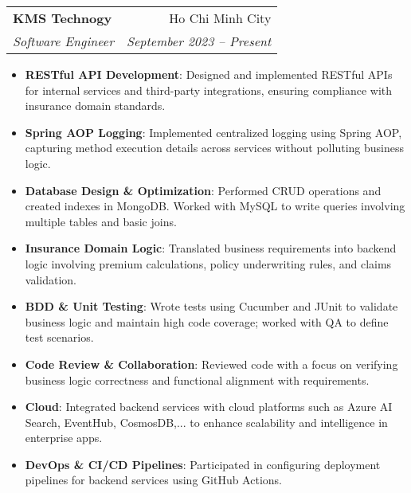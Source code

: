 \documentclass[letterpaper,11pt]{article}
\makeatletter
\newcommand{\resumeItem}[2]{
  \item\small{
    \textbf{#1}{: #2 \vspace{-2pt}}
  }
}
\newcommand{\resumeSubheading}[4]{
  \vspace{-1pt}\item
    \begin{tabular*}{0.97\textwidth}[t]{l@{\extracolsep{\fill}}r}
      \textbf{#1} & #2 \\
      \textit{\small#3} & \textit{\small #4} \\
    \end{tabular*}\vspace{-5pt}
}
\newcommand{\resumeSubSubheading}[2]{
    \begin{tabular*}{0.97\textwidth}{l@{\extracolsep{\fill}}r}
      \textit{\small#1} & \textit{\small #2} \\
    \end{tabular*}\vspace{-5pt}
}
\newcommand{\resumeItemListStart}{\begin{itemize}}
\newcommand{\resumeItemListEnd}{\end{itemize}\vspace{-5pt}}
\makeatother
\begin{document}
    \resumeSubheading
      {KMS Technogy}{Ho Chi Minh City}
      {Software Engineer}{September 2023 -- Present}
      \resumeItemListStart
        \resumeItem{RESTful API Development}
          {Designed and implemented RESTful APIs for internal services and third-party integrations, ensuring compliance with insurance domain standards.}
        \resumeItem{Spring AOP Logging}
          {Implemented centralized logging using Spring AOP, capturing method execution details across services without polluting business logic.}
        \resumeItem{Database Design \& Optimization}
          {Performed CRUD operations and created indexes in MongoDB. Worked with MySQL to write queries involving multiple tables and basic joins.}
        \resumeItem{Insurance Domain Logic}
          {Translated business requirements into backend logic involving premium calculations, policy underwriting rules, and claims validation.}
        \resumeItem{BDD \& Unit Testing}
          {Wrote tests using Cucumber and JUnit to validate business logic and maintain high code coverage; worked with QA to define test scenarios.}
        \resumeItem{Code Review \& Collaboration}
          {Reviewed code with a focus on verifying business logic correctness and functional alignment with requirements.}        
        \resumeItem{Cloud}
          {Integrated backend services with cloud platforms such as Azure AI Search, EventHub, CosmosDB,... to enhance scalability and intelligence in enterprise apps.}
        \resumeItem{DevOps \& CI/CD Pipelines}
          {Participated in configuring deployment pipelines for backend services using GitHub Actions.}
      \resumeItemListEnd
      

\end{document}
